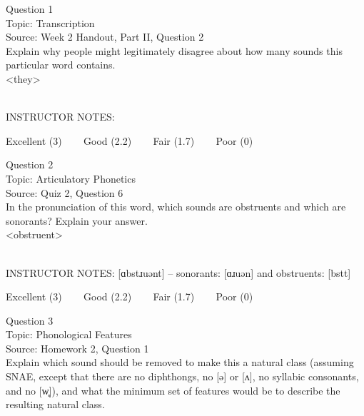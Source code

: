 \documentclass[12pt]{article}
\begin{document}
\begin{center}
\textbf{{\color{blue}{\HUGE START OF EXAM\\}}}

\textbf{{\color{blue}{\HUGE Student ID: 85086\\}}}

\textbf{{\color{blue}{\HUGE \\}}}

\end{center}
\newpage

{\large Question 1}\\

Topic: Transcription\\
Source: Week 2 Handout, Part II, Question 2\\

Explain why people might legitimately disagree about how many sounds this particular word contains.\\

<they>


~\\
INSTRUCTOR NOTES: 


\vfill
Excellent (3) ~~~ Good (2.2) ~~~ Fair (1.7) ~~~ Poor (0)
\newpage

{\large Question 2}\\

Topic: Articulatory Phonetics\\
Source: Quiz 2, Question 6\\

In the pronunciation of this word, which sounds are obstruents and which are sonorants? Explain your answer.\\

<obstruent>


~\\
INSTRUCTOR NOTES: [ɑbstɹuənt] -- sonorants: [ɑɹuən] and obstruents: [bstt]


\vfill
Excellent (3) ~~~ Good (2.2) ~~~ Fair (1.7) ~~~ Poor (0)
\newpage

{\large Question 3}\\

Topic: Phonological Features\\
Source: Homework 2, Question 1\\

Explain which sound should be removed to make this a natural class (assuming SNAE, except that there are no diphthongs, no [ə] or [ʌ], no syllabic consonants, and no [w̥]), and what the minimum set of features would be to describe the resulting natural class.\\
\end{document}
